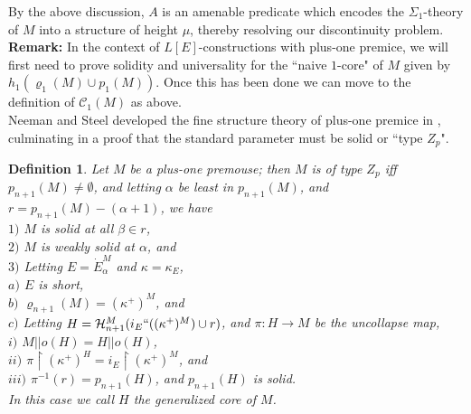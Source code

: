 \documentclass[12pt]{article}
\newtheorem{defn}[thm]{Definition}
\begin{document}
By the above discussion, $A$ is an amenable predicate which encodes the $\Sigma_1$-theory of $M$ into a structure of height $\mu$, thereby resolving our discontinuity problem.\\


\textbf{Remark:}  In the context of $L[E]$-constructions with plus-one premice, we will first need to prove solidity and universality for the ``naive $1$-core"  of $M$ given by $h_1 (\varrho_1 (M) \cup p_1 (M))$.  Once this has been done we can move to the definition of $\mathcal{C}_1 (M)$ as above.\\

Neeman and Steel developed the fine structure theory of plus-one premice in \cite{FSPIPM}, culminating in a proof that the standard parameter must be solid or ``type $Z_p$".\\

\begin{defn} \label{type Z_p}
Let $M$ be a plus-one premouse; then $M$ is of type $Z_p$ iff $p_{n+1}(M) \neq \emptyset$, and letting $\alpha$ be least in $p_{n+1} (M)$, and $r = p_{n+1} (M) - ( \alpha + 1 )$, we have\\

\indent \indent $1)$ $M$ is solid at all $\beta \in r$,\\

\indent \indent $2)$ $M$ is weakly solid at $\alpha$, and\\

\indent \indent $3)$ Letting $E = \dot{E}_\alpha^M$ and $\kappa = \kappa_E$,\\

\indent \indent \indent \indent $a)$ $E$ is short,\\

\indent \indent \indent \indent $b)$ $\varrho_{n+1} (M) = (\kappa^+)^M$, and\\

\indent \indent \indent \indent $c)$ Letting $H = \mathcal{H}_{n+1}^M ( i_E `` (( \kappa^+)^M ) \cup r )$, and $\pi: H \longrightarrow M$ be the uncollapse map,\\

\indent \indent \indent \indent \indent $i)$ $M || o(H) = H || o(H)$,\\

\indent \indent \indent \indent \indent $ii)$ $\pi \restriction ( \kappa^+)^H = i_E \restriction ( \kappa^+ )^M$, and\\

\indent \indent \indent \indent \indent $iii)$ $\pi^{-1} (r) = p_{n+1} (H)$, and $p_{n+1} (H)$ is solid.\\

In this case we call $H$ the generalized core of $M$.
\end{defn}
\end{document}
